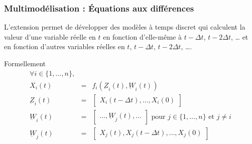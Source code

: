 \documentclass[xetex, compress, table, svgnames]{beamer}
\begin{document}
\begin{frame}
  \frametitle{Multimodélisation : Équations aux différences}
  \begin{alertblock}{}
    L'extension  permet de développer des
    modèles à temps discret qui calculent la valeur d'une variable
    réelle en $t$ en fonction d'elle-même à $t-\Delta t$, $t-2\Delta
    t$, \dots{} et en fonction d'autres variables réelles en $t$,
    $t-\Delta t$, $t-2\Delta t$, \dots{}.
  \end{alertblock}
  \begin{block}{Formellement}
    \begin{eqnarray*}
      \forall i \in \{1,\ldots,n\}, &~&\\
      X_i(t)&=&f_i(\underbar Z_i(t),\underbar W_i(t))\\
      \underbar Z_i(t) &=& \begin{bmatrix} X_i(t-\Delta t), \ldots, X_i(0)
      \end{bmatrix}\\
      \underbar W_i(t) &=& \begin{bmatrix} \ldots, \underbar W_{j}(t), \ldots
      \end{bmatrix}\text{ pour } j \in \{1,\ldots,n\}\text{ et }j \neq i\\
      \underbar W_j(t) &=& \begin{bmatrix} X_j(t), X_j(t-\Delta t), \ldots,
        X_j(0) \end{bmatrix}\\
    \end{eqnarray*}
  \end{block}
\end{frame}
\end{document}
